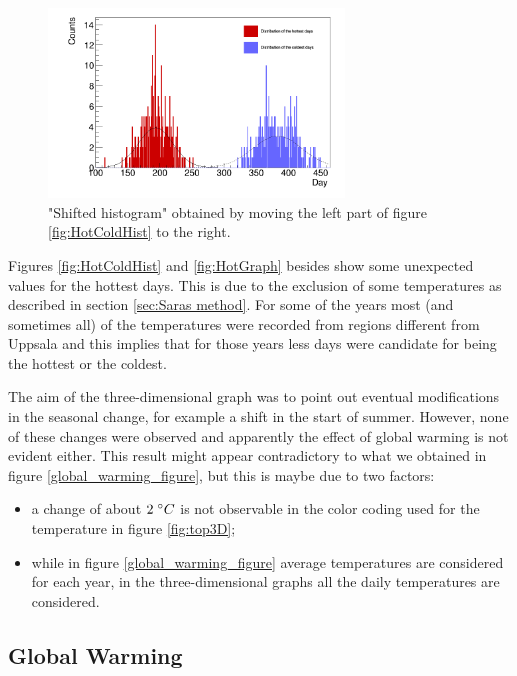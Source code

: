 \documentclass[a4paper]{article}
\begin{document}
\begin{figure}[H]
\begin{center}
\includegraphics[width=0.7\textwidth]{HotCold_shifted.png}
\caption{"Shifted histogram" obtained by moving the left part of figure \ref{fig:HotColdHist} to the right.}
\label{fig:HotColdHist2}
\end{center}
\end{figure}


Figures \ref{fig:HotColdHist} and \ref{fig:HotGraph} besides show some unexpected values for the hottest days. This is due to the exclusion of some temperatures as described in section
\ref{sec:Saras method}. For some of the years most (and sometimes all) of the temperatures were recorded from regions
different from Uppsala and this implies that for those years less days were candidate for being the hottest or the coldest. 

\medskip
\medskip
The aim of the three-dimensional graph was to point out eventual modifications in the seasonal change, for example a shift in the start of summer. However, none of these changes were observed and apparently the effect of global warming is not evident either. This result might appear contradictory to what we obtained in figure \ref{global_warming_figure}, but this is maybe due to two factors:
\begin{itemize}
\item a change of about $2 \hspace{1mm} ^\circ C$ is not observable in the color coding used for the temperature in figure \ref{fig:top3D};
\item while in figure \ref{global_warming_figure} average temperatures are considered for each year, in the three-dimensional graphs all the daily temperatures are considered.
\end{itemize}


\subsection{Global Warming}
\end{document}
